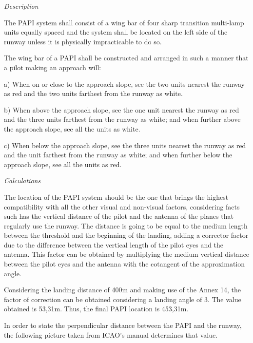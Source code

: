 		\textit{Description}
		
		The PAPI system shall consist of a wing bar of four sharp transition multi-lamp units
		equally spaced and the system shall be located on the left side of the runway unless it is physically impracticable to do so. 
		
		The wing bar of a PAPI shall be constructed and arranged in such a manner that a pilot making an approach
		will:
		
		a) When on or close to the approach slope, see the two units nearest the runway as red and the two units farthest from the runway as white.
		
		b) When above the approach slope, see the one unit nearest the runway as red and the three units farthest from the runway as white; and when further above the approach slope, see all the units as white.
		
		c) When below the approach slope, see the three units nearest the runway as red and the unit farthest from the runway as white; and when further below the approach slope, see all the units as red.
		
		\textit{Calculations}
		
		The location of the PAPI system should be the one that brings the highest compatibility with all the other visual and non-visual factors, considering facts such has the vertical distance of the pilot and the antenna of the planes that regularly use the runway. The distance is going to be equal to the medium length between the threshold and the beginning of the landing, adding a corrector factor due to the difference between the vertical length of the pilot eyes and the antenna. This factor can be obtained by multiplying the medium vertical distance between the pilot eyes and the antenna with the cotangent of the approximation angle. 
		
		Considering the landing distance of 400m and making use of the Annex 14, the factor of correction can be obtained considering a landing angle of 3\degree. The value obtained is 53,31m. Thus, the final PAPI location is 453,31m.
		
		In order to state the perpendicular distance between the PAPI and the runway, the following picture taken from ICAO's manual determines that value. 
		
